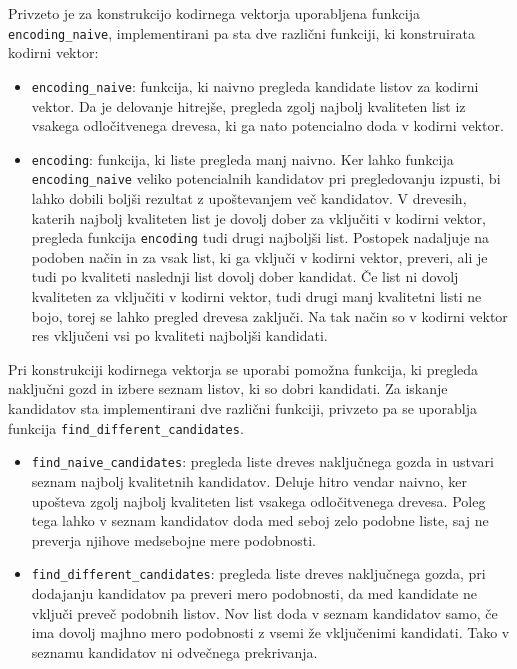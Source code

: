 \documentclass[12pt,a4paper,twoside]{article}
\theoremstyle{definition} %
\theoremstyle{plain} %
\numberwithin{equation}{section}  %
\begin{document}
Privzeto je za konstrukcijo kodirnega vektorja uporabljena funkcija \texttt{encoding\_naive},
implementirani pa sta dve različni funkciji, ki konstruirata kodirni vektor:

\begin{itemize}
	\item \texttt{encoding\_naive}: funkcija, ki naivno pregleda kandidate listov za kodirni vektor. 
	Da je delovanje hitrejše, pregleda zgolj najbolj kvaliteten list iz vsakega odločitvenega drevesa, ki ga nato potencialno doda v kodirni vektor.

	\item \texttt{encoding}: funkcija, ki liste pregleda manj naivno.
	Ker lahko funkcija \texttt{encoding\_naive} veliko potencialnih kandidatov pri pregledovanju izpusti, bi lahko dobili boljši rezultat z upoštevanjem več kandidatov.
	V drevesih, katerih najbolj kvaliteten list je dovolj dober za vključiti v kodirni vektor, pregleda funkcija \texttt{encoding} tudi drugi najboljši list.
	Postopek nadaljuje na podoben način in za vsak list, ki ga vključi v kodirni vektor, preveri, ali je tudi po kvaliteti naslednji list dovolj dober kandidat.
	Če list ni dovolj kvaliteten za vključiti v kodirni vektor, tudi drugi manj kvalitetni listi ne bojo, torej se lahko pregled drevesa zaključi.
	Na tak način so v kodirni vektor res vključeni vsi po kvaliteti najboljši kandidati.
\end{itemize}

Pri konstrukciji kodirnega vektorja se uporabi pomožna funkcija, ki pregleda naključni gozd in izbere seznam listov, ki so dobri kandidati.
Za iskanje kandidatov sta implementirani dve različni funkciji, privzeto pa se uporablja funkcija \texttt{find\_different\_candidates}.

\begin{itemize}
	\item \texttt{find\_naive\_candidates}: pregleda liste dreves naključnega gozda in ustvari seznam najbolj kvalitetnih kandidatov.
	Deluje hitro vendar naivno, ker upošteva zgolj najbolj kvaliteten list vsakega odločitvenega drevesa.
	Poleg tega lahko v seznam kandidatov doda med seboj zelo podobne liste, saj ne preverja njihove medsebojne mere podobnosti.

	\item \texttt{find\_different\_candidates}: pregleda liste dreves naključnega gozda, 
	pri dodajanju kandidatov pa preveri mero podobnosti, da med kandidate ne vključi preveč podobnih listov.
	Nov list doda v seznam kandidatov samo, če ima dovolj majhno mero podobnosti z vsemi že vključenimi kandidati.
	Tako v seznamu kandidatov ni odvečnega prekrivanja.
\end{itemize}
\end{document}
